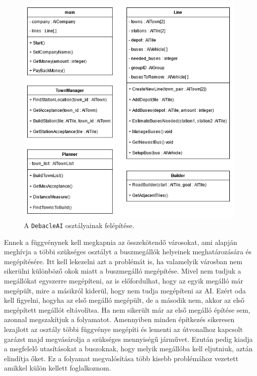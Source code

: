 \begin{figure}
	\centering
	\includegraphics[width=\textwidth]{images/line.png}
	\caption{A \texttt{DebacleAI} osztályainak felépítése.}
	\label{fig:line}
\end{figure}

Ennek a függvénynek kell megkapnia az összekötendő városokat, ami alapján meghívja a többi szükséges osztályt a buszmegállók helyeinek meghatározására és megépítésére. Itt kell lekezelni azt a problémát is, ha valamelyik városban nem sikerülni különböző okok miatt a buszmegálló megépítése. Mivel nem tudjuk a megállókat egyszerre megépíteni, az is előfordulhat, hogy az egyik megálló már megépült, mire a másikról kiderül, hogy nem tudja megépíteni az AI. Ezért oda kell figyelni, hogyha az első megálló megépült, de a második nem, akkor az első megépített megállót eltávolítsa. Ha nem sikerült már az első megálló építése sem, azonnal megszakítjuk a folyamatot. Amennyiben minden építkezés sikeresen lezajlott az osztály többi függvénye megépíti és lementi az útvonalhoz kapcsolt garázst majd megvásárolja a szükséges mennyiségű járművet. Ezután pedig kiadja a megfelelő utasításokat a buszoknak, hogy melyik megállóba kell eljutniuk, aztán elindítja őket. Ez a folyamat megvalósítása több kisebb problémához vezetett amikkel külön kellett foglalkoznom.

